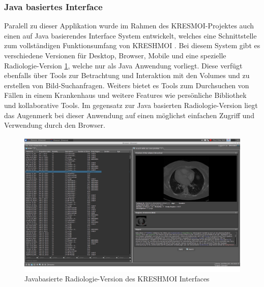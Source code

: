 \subsubsection{Java basiertes Interface}
\label{sec:Java basiertes Interface}
Paralell zu dieser Applikation wurde im Rahmen des KRESMOI-Projektes auch einen auf Java basierendes Interface System entwickelt,
welches eine Schnittstelle zum vollständigen Funktionsumfang von KRESHMOI .
Bei diesem System gibt es verschiedene Versionen für Desktop, Browser, Mobile und eine spezielle Radiologie-Version \ref{fig:javabased_interface}, welche nur als Java Anwendung vorliegt.
Diese verfügt ebenfalls über Tools zur Betrachtung und Interaktion mit den Volumes und zu erstellen von Bild-Suchanfragen.
Weiters bietet es Tools zum Durchsuchen von Fällen in einem Krankenhaus und weitere Features wie persönliche Bibliothek und kollaborative Tools.
Im gegensatz zur Java basierten Radiologie-Version liegt das Augenmerk bei dieser Anwendung auf einen möglichst einfachen Zugriff und Verwendung durch den Browser.
\begin{figure}[t]
	\centering
	\includegraphics[width=0.8\linewidth]{img/c1_javainterface_indexview.png}
	\caption{Javabasierte Radiologie-Version des KRESHMOI Interfaces}
	\label{fig:javabased_interface}
\end{figure}

